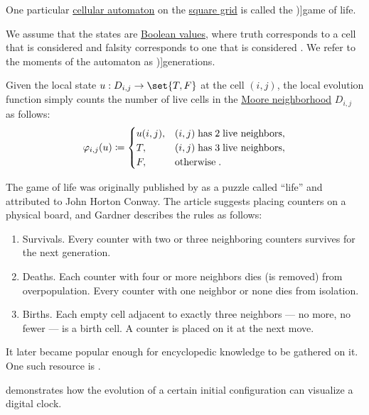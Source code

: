 \begin{definition}\label{def:game_of_life}\mimprovised
  One particular \hyperref[def:cellular_automaton]{cellular automaton} on the \hyperref[rem:automata_on_square_grid]{square grid} is called the \term[en=Game of Life (\cite[3]{HadelerMüller2017CellularAutomata})]{game of life}.

  We assume that the states are \hyperref[def:boolean_value]{Boolean values}, where truth corresponds to a cell that is considered  and falsity corresponds to one that is considered . We refer to the moments of the automaton as \term[en=generation (\cite[120]{Gardner1970GameOfLife})]{generations}.

  Given the local state \( u: D_{i, j} \to \set{ T, F } \) at the cell \( (i, j) \), the local evolution function simply counts the number of  live cells in the \hyperref[def:cayley_graph_neighborhood/moore]{Moore neighborhood} \( D_{i, j} \) as follows:
  \begin{equation}\label{eq:def:game_of_life}
    \varphi_{i,j}(u) \coloneqq \begin{cases}
      u(i, j), &(i, j) \T{has} 2 \T{live neighbors}, \\
      T,       &(i, j) \T{has} 3 \T{live neighbors}, \\
      F,       &\T{otherwise}.
    \end{cases}
  \end{equation}
\end{definition}
\begin{comments}
  \item The game of life was originally published by  as a puzzle called \enquote{life} and attributed to John Horton Conway. The article suggests placing counters on a physical board, and Gardner describes the rules as follows:
  \begin{displayquote}
    \begin{enumerate}
      \item Survivals. Every counter with two or three neighboring counters survives for the next generation.
      \item Deaths. Each counter with four or more neighbors dies (is removed) from overpopulation. Every counter with one neighbor or none dies from isolation.
      \item Births. Each empty cell adjacent to exactly three neighbors --- no more, no fewer --- is a birth cell. A counter is placed on it at the next move.
    \end{enumerate}
  \end{displayquote}

  It later became popular enough for encyclopedic knowledge to be gathered on it. One such resource is \cite{ConwayLife:home}.

  \cite{CGSE:game_of_life_digital_clock} demonstrates how the evolution of a certain initial configuration can visualize a digital clock.
\end{comments}

